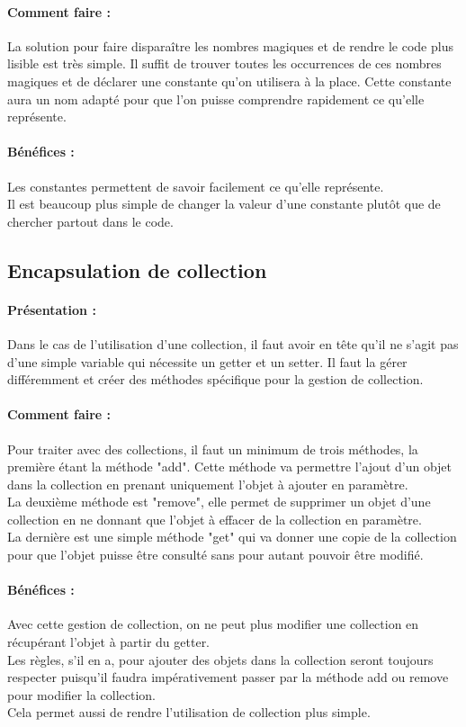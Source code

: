 \documentclass[a4paper,twoside,12pt,openright]{report}
\begin{document}
\paragraph{Comment faire :}
La solution pour faire disparaître les nombres magiques et de rendre le code plus lisible est très simple. Il suffit de trouver toutes les occurrences de ces nombres magiques et de déclarer une constante qu'on utilisera à la place. Cette constante aura un nom adapté pour que l'on puisse comprendre rapidement ce qu'elle représente.

\paragraph{Bénéfices :}
Les constantes permettent de savoir facilement ce qu'elle représente.\\
Il est beaucoup plus simple de changer la valeur d'une constante plutôt que de chercher partout dans le code.\\

\subsection{Encapsulation de collection}
\paragraph{Présentation :}
Dans le cas de l'utilisation d'une collection, il faut avoir en tête qu'il ne s'agit pas d'une simple variable qui nécessite un getter et un setter. Il faut la gérer différemment et créer des méthodes spécifique pour la gestion de collection.

\paragraph{Comment faire :}
Pour traiter avec des collections, il faut un minimum de trois méthodes, la première étant la méthode "add". Cette méthode va permettre l'ajout d'un objet dans la collection en prenant uniquement l'objet à ajouter en paramètre.\\
La deuxième méthode est "remove", elle permet de supprimer un objet d'une collection en ne donnant que l'objet à effacer de la collection en paramètre.\\
La dernière est une simple méthode "get" qui va donner une copie de la collection pour que l'objet puisse être consulté sans pour autant pouvoir être modifié.

\paragraph{Bénéfices :}
Avec cette gestion de collection, on ne peut plus modifier une collection en récupérant l'objet à partir du getter.\\
Les règles, s'il en a, pour ajouter des objets dans la collection seront toujours respecter puisqu'il faudra impérativement passer par la méthode add ou remove pour modifier la collection.\\
Cela permet aussi de rendre l'utilisation de collection plus simple.\\
\end{document}
